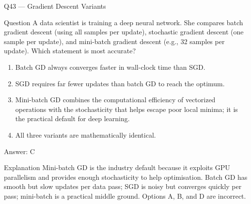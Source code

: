 \documentclass[aspectratio=169,8pt]{beamer}
\begin{document}
	\begin{frame}{Q43 --- Gradient Descent Variants}
		\begin{block}{Question}
			A data scientist is training a deep neural network. She compares batch gradient descent (using all samples per update), stochastic gradient descent (one sample per update), and mini-batch gradient descent (e.g., 32 samples per update). Which statement is most accurate?
		\end{block}
		\begin{enumerate}
			\item Batch GD always converges faster in wall-clock time than SGD.
			\item SGD requires far fewer updates than batch GD to reach the optimum.
			\item Mini-batch GD combines the computational efficiency of vectorized operations with the stochasticity that helps escape poor local minima; it is the practical default for deep learning.
			\item All three variants are mathematically identical.
		\end{enumerate}
		\begin{exampleblock}{Answer: C}\end{exampleblock}
		\begin{block}{Explanation}
			Mini-batch GD is the industry default because it exploits GPU parallelism and provides enough stochasticity to help optimisation. Batch GD has smooth but slow updates per data pass; SGD is noisy but converges quickly per pass; mini-batch is a practical middle ground. Options A, B, and D are incorrect.
		\end{block}
	\end{frame}
	
\end{document}
